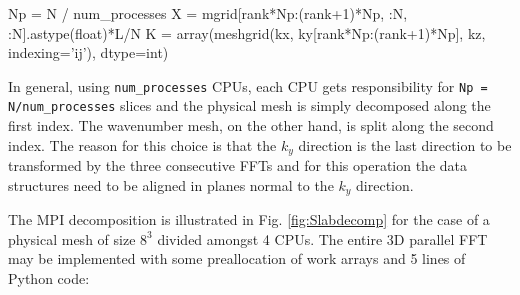 \documentclass[11pt, oneside]{article}
\newcommand{\inpyth}{\lstinline[style=pythonstyle, basicstyle=\ttfamily]} %[]%
\begin{document}
\begin{python}
Np = N / num_processes
X = mgrid[rank*Np:(rank+1)*Np, :N, :N].astype(float)*L/N
K = array(meshgrid(kx, ky[rank*Np:(rank+1)*Np], kz, 
                   indexing='ij'), dtype=int)
\end{python}
In general, using \inpyth{num_processes} CPUs, each CPU gets responsibility for \inpyth{Np = N/num_processes} slices and the physical mesh is simply decomposed along the first index. The wavenumber mesh, on the other hand, is split along the second index. The reason for this choice is that the $k_y$ direction is the last direction to be transformed by the three consecutive FFTs and for this operation the data structures need to be aligned in planes normal to the $k_y$ direction.

The MPI decomposition is illustrated in Fig. \ref{fig:Slabdecomp} for the case of a physical mesh of size $8^3$ divided amongst 4 CPUs. The entire 3D parallel FFT may be implemented with some preallocation of work arrays and 5 lines of Python code:
\end{document}
